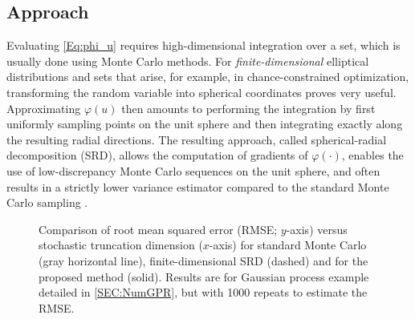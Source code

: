 \documentclass[%
onefignum,onetabnum]{siamonline250211}
\newcommand{\hiSRD}{{\sc hiSRD}}
\begin{document}
\subsection{Approach}
Evaluating \eqref{Eq:phi_u} requires high-dimensional integration over a set, which is usually done using Monte Carlo methods. For \emph{finite-dimensional} elliptical distributions and sets that arise, for example, in chance-constrained optimization, transforming the random variable into spherical coordinates proves very useful. Approximating $\varphi(u)$ then amounts to performing the integration by first uniformly sampling points on the unit sphere and then integrating exactly along the resulting radial directions.
The resulting approach, called spherical-radial decomposition (SRD), allows the computation of gradients of $\varphi(\cdot)$, enables the use of low-discrepancy Monte Carlo sequences on the unit sphere, and often results in a strictly lower variance estimator compared to the standard Monte Carlo sampling \cite{AcHe-SIAM14,AcHe-SIAM17,HeStWe-SIAM25}.

\begin{figure}[tb]
    \centering
    \caption{Comparison of root mean squared error (RMSE; $y$-axis) versus stochastic truncation dimension ($x$-axis) for standard Monte Carlo (gray horizontal line), finite-dimensional SRD (dashed) and for the proposed method (solid). Results are for Gaussian process example detailed in \cref{SEC:NumGPR}, but with 1000 repeats to estimate the RMSE.
    }\label{fig:intro}
\end{figure}
\end{document}
